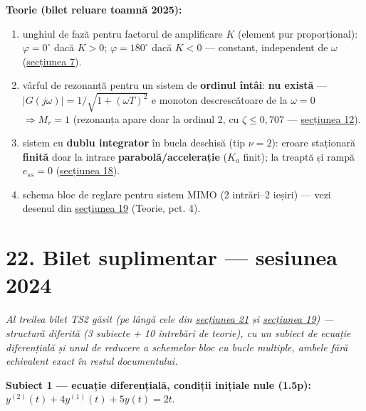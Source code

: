 \documentclass[10pt,a4paper]{article}
\begin{document}
\begin{keyeq}\color{red!65!black}
\textbf{Teorie (bilet reluare toamnă 2025):}
\begin{enumerate}
\item unghiul de fază pentru factorul de amplificare $K$ (element pur proporțional): $\varphi{=}0^\circ$ dacă $K{>}0$; $\varphi{=}180^\circ$ dacă $K{<}0$ — constant, independent de $\omega$ (\hyperref[sec:7]{secțiunea 7}).
\item vârful de rezonanță pentru un sistem de \textbf{ordinul întâi}: \textbf{nu există} — $|G(j\omega)|{=}1/\sqrt{1{+}(\omega T)^2}$ e monoton descrescătoare de la $\omega{=}0$ $\Rightarrow M_r{=}1$ (rezonanța apare doar la ordinul 2, cu $\zeta\le0{,}707$ — \hyperref[sec:12]{secțiunea 12}).
\item sistem cu \textbf{dublu integrator} în bucla deschisă (tip $\nu{=}2$): eroare staționară \textbf{finită} doar la intrare \textbf{parabolă/accelerație} ($K_a$ finit); la treaptă și rampă $e_{ss}{=}0$ (\hyperref[sec:18]{secțiunea 18}).
\item schema bloc de reglare pentru sistem MIMO (2 intrări–2 ieșiri) — vezi desenul din \hyperref[sec:19]{secțiunea 19} (Teorie, pct. 4).
\end{enumerate}
\end{keyeq}

\section*{22. Bilet suplimentar — sesiunea 2024}\label{sec:22}
\textit{Al treilea bilet TS2 găsit (pe lângă cele din \hyperref[sec:21]{secțiunea 21} și \hyperref[sec:19]{secțiunea 19}) — structură diferită (3 subiecte + 10 întrebări de teorie), cu un subiect de ecuație diferențială și unul de reducere a schemelor bloc cu bucle multiple, ambele fără echivalent exact în restul documentului.}

\textbf{Subiect 1 — ecuație diferențială, condiții inițiale nule (1.5p):} $y^{(2)}(t)+4y^{(1)}(t)+5y(t)=2t$.
\end{document}

